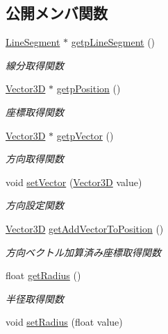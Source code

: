 \subsection*{公開メンバ関数}
\begin{DoxyCompactItemize}
\item 
\mbox{\hyperlink{class_line_segment}{Line\+Segment}} $\ast$ \mbox{\hyperlink{class_cylinder_af6e950f09496e5aac060a3f297da3ae2}{getp\+Line\+Segment}} ()
\begin{DoxyCompactList}\small\item\em 線分取得関数 \end{DoxyCompactList}\item 
\mbox{\hyperlink{class_vector3_d}{Vector3D}} $\ast$ \mbox{\hyperlink{class_cylinder_abf7bd0ec7c85488de892601bc9e23e94}{getp\+Position}} ()
\begin{DoxyCompactList}\small\item\em 座標取得関数 \end{DoxyCompactList}\item 
\mbox{\hyperlink{class_vector3_d}{Vector3D}} $\ast$ \mbox{\hyperlink{class_cylinder_a81a0ee46547b6c2e4e10fc821389f377}{getp\+Vector}} ()
\begin{DoxyCompactList}\small\item\em 方向取得関数 \end{DoxyCompactList}\item 
void \mbox{\hyperlink{class_cylinder_aaf5a9d7cf018efb1e200a1e4ccb41a20}{set\+Vector}} (\mbox{\hyperlink{class_vector3_d}{Vector3D}} value)
\begin{DoxyCompactList}\small\item\em 方向設定関数 \end{DoxyCompactList}\item 
\mbox{\hyperlink{class_vector3_d}{Vector3D}} \mbox{\hyperlink{class_cylinder_af36a39d5a18d1a837d9880a00447d87b}{get\+Add\+Vector\+To\+Position}} ()
\begin{DoxyCompactList}\small\item\em 方向ベクトル加算済み座標取得関数 \end{DoxyCompactList}\item 
float \mbox{\hyperlink{class_cylinder_a54bd26ac60e885bdca9a101fcc998711}{get\+Radius}} ()
\begin{DoxyCompactList}\small\item\em 半径取得関数 \end{DoxyCompactList}\item 
void \mbox{\hyperlink{class_cylinder_a3baa0a5587c54b7a92f170ce52d0f658}{set\+Radius}} (float value)

\end{DoxyCompactItemize}
